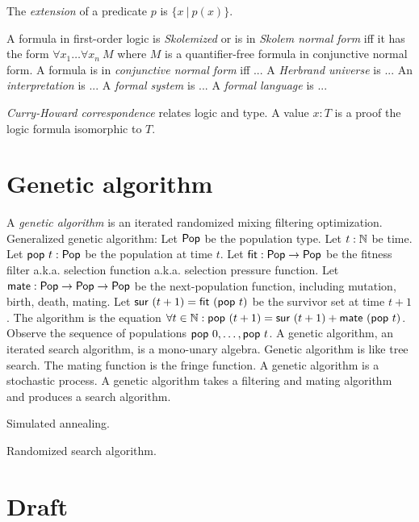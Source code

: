 %
The \emph{extension} of a predicate \(p\) is \(\{x~|~p(x)\}\).

%
%
%
%
A formula in first-order logic is \emph{Skolemized} or is in \emph{Skolem normal form}
iff it has the form \(\forall x_1 \ldots \forall x_n ~ M\)
where \(M\) is a quantifier-free formula in conjunctive normal form.
A formula is in \emph{conjunctive normal form} iff ...
%
A \emph{Herbrand universe} is ...
%
An \emph{interpretation} is ...
A \emph{formal system} is ...
A \emph{formal language} is ...

%
\emph{Curry-Howard correspondence} relates logic and type.
A value \(x : T\) is a proof the logic formula isomorphic to \(T\).

\section{Genetic algorithm}

\newcommand\fit{\fun{fit}}
\newcommand\mate{\fun{mate}}
\newcommand\pop{\fun{pop}}
\newcommand\sur{\fun{sur}}
\newcommand\Pop{\fun{Pop}}

A \emph{genetic algorithm} is an iterated randomized mixing filtering optimization.
Generalized genetic algorithm:
Let \(\Pop\) be the population type.
Let \(t : \mathbb{N}\) be time.
Let \(\pop~t : \Pop\) be the population at time \(t\).
Let \(\fit : \Pop \to \Pop\) be the fitness filter a.k.a. selection function a.k.a. selection pressure function.
Let \(\mate : \Pop \to \Pop \to \Pop\) be the next-population function,
including mutation, birth, death, mating.
Let \(\sur~(t+1) = \fit~(\pop~t)\) be the survivor set at time \(t+1\).
The algorithm is the equation \(\forall t \in \Nat : \pop~(t+1) = \sur~(t+1) + \mate~(\pop~t)\).
Observe the sequence of populations \(\pop~0, \ldots, \pop~t\).
A genetic algorithm, an iterated search algorithm, is a mono-unary algebra.
Genetic algorithm is like tree search.
The mating function is the fringe function.
A genetic algorithm is a stochastic process.
A genetic algorithm takes a filtering and mating algorithm and produces a search algorithm.

Simulated annealing.

Randomized search algorithm.

\section{Draft}

